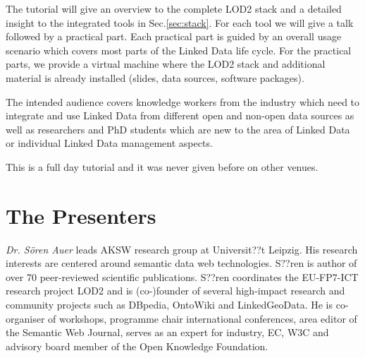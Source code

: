 \documentclass[a4paper, 11pt]{llncs}
\begin{document}

The tutorial will give an overview to the complete LOD2 stack and a detailed insight to the integrated tools in Sec.\ref{sec:stack}.
For each tool we will give a talk followed by a practical part.
Each practical part is guided by an overall usage scenario which covers most parts of the Linked Data life cycle.
For the practical parts, we provide a virtual machine where the LOD2 stack and additional material is already installed (slides, data sources, software packages).

The intended audience covers knowledge workers from the industry which need to integrate and use Linked Data from different open and non-open data sources as well as researchers and PhD students which are new to the area of Linked Data or individual Linked Data management aspects.

This is a full day tutorial and it was never given before on other venues.


    

\section{The Presenters}


\emph{Dr. S\"oren Auer} leads AKSW research group at Universit??t Leipzig.
His research interests are centered around semantic data web technologies.
S??ren is author of over 70 peer-reviewed scientific publications.
S??ren coordinates the EU-FP7-ICT research project LOD2 and is (co-)founder of several high-impact research and community projects such as DBpedia, OntoWiki and LinkedGeoData.
He is co-organiser of workshops, programme chair international conferences, area editor of the Semantic Web Journal, serves as an expert for industry, EC, W3C and advisory board member of the Open Knowledge Foundation.
\end{document}
